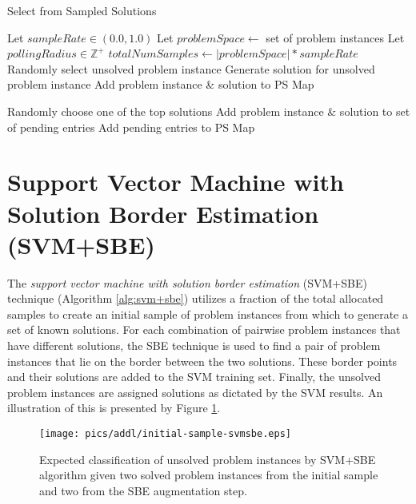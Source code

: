 \begin{algorithm}
\caption{Select from Sampled Solutions}   
\label{alg:sss}
\small
\begin{algorithmic}[1] 
  
  \State Let $sampleRate \in (0.0,1.0)$
  \State Let $problemSpace \leftarrow$ set of problem instances
  \State Let $pollingRadius \in \mathbb{Z}^+$ 
  \State $totalNumSamples \leftarrow |problemSpace| * sampleRate$
    \State Randomly select unsolved problem instance
    \State Generate solution for unsolved problem instance
    \State Add problem instance \& solution to PS Map
  \EndFor

      \State Randomly choose one of the top solutions
    \EndIf
    \State Add problem instance \& solution to set of pending entries 
  \EndFor
  \State Add pending entries to PS Map 
\end{algorithmic}
\end{algorithm}


\section{Support Vector Machine with Solution Border Estimation (SVM+SBE)}
The \textit{support vector machine with solution border estimation} (SVM+SBE) technique (Algorithm \ref{alg:svm+sbe}) utilizes a fraction of the total allocated samples to create an initial sample of problem instances from which to generate a set of known solutions.  For each combination of pairwise problem instances that have different solutions, the SBE technique is used to find a pair of problem instances that lie on the border between the two solutions.  These border points and their solutions are added to the SVM training set.  Finally, the unsolved problem instances are assigned solutions as dictated by the SVM results.  An illustration of this is presented by Figure \ref{fig:initial-sample-svmsbe-addl}.


\begin{figure}
\begin{center}
    \texttt{[image: pics/addl/initial-sample-svmsbe.eps]}
    \caption{Expected classification of unsolved problem instances by SVM+SBE algorithm given two solved problem instances from the initial sample and two from the SBE augmentation step.}
    \label{fig:initial-sample-svmsbe-addl}
\end{center}
\end{figure}


